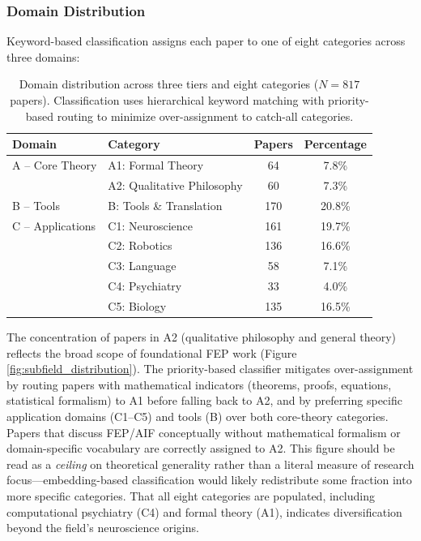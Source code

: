 \documentclass[
  english,
]{article}
\begin{document}
\subsubsection{Domain Distribution}\label{domain-distribution}

Keyword-based classification assigns each paper to one of eight
categories across three domains:

\begin{table}[htbp]
\centering
\caption{Domain distribution across three tiers and eight categories ($N = 817$ papers). Classification uses hierarchical keyword matching with priority-based routing to minimize over-assignment to catch-all categories.}
\label{tab:domain_distribution}
\begin{tabular}{llcc}
\toprule
\textbf{Domain} & \textbf{Category} & \textbf{Papers} & \textbf{Percentage} \\
\midrule
A -- Core Theory & A1: Formal Theory & 64 & 7.8\% \\
 & A2: Qualitative Philosophy & 60 & 7.3\% \\
\midrule
B -- Tools & B: Tools \& Translation & 170 & 20.8\% \\
\midrule
C -- Applications & C1: Neuroscience & 161 & 19.7\% \\
 & C2: Robotics & 136 & 16.6\% \\
 & C3: Language & 58 & 7.1\% \\
 & C4: Psychiatry & 33 & 4.0\% \\
 & C5: Biology & 135 & 16.5\% \\
\bottomrule
\end{tabular}
\end{table}

The concentration of papers in A2 (qualitative philosophy and general
theory) reflects the broad scope of foundational FEP work (Figure
\ref{fig:subfield_distribution}). The priority-based classifier
mitigates over-assignment by routing papers with mathematical indicators
(theorems, proofs, equations, statistical formalism) to A1 before
falling back to A2, and by preferring specific application domains
(C1--C5) and tools (B) over both core-theory categories. Papers that
discuss FEP/AIF conceptually without mathematical formalism or
domain-specific vocabulary are correctly assigned to A2. This figure
should be read as a \emph{ceiling} on theoretical generality rather than
a literal measure of research focus---embedding-based classification
would likely redistribute some fraction into more specific categories.
That all eight categories are populated, including computational
psychiatry (C4) and formal theory (A1), indicates diversification beyond
the field's neuroscience origins.
\end{document}
